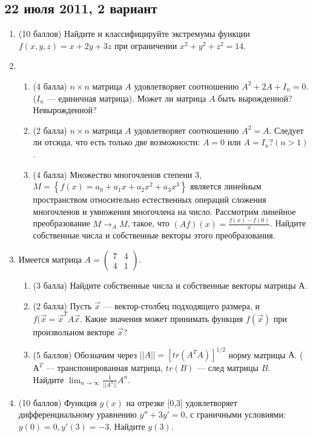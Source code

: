 \documentclass[pdftex,12pt,a4paper]{article}
\begin{document}
\subsection{22 июля 2011, 2 вариант}
\begin{enumerate}
\item (10 баллов) Найдите и классифицируйте экстремумы функции $f(x,y,z)=x+2y+3z$ при ограничении $x^2+y^2+z^2=14$.\\
\item \begin{enumerate}
\item (4 балла) $n\times n$ матрица $A$ удовлетворяет соотношению $A^2+2A+I_n=0$. ($I_n$ --- единичная матрица). Может ли матрица $A$ быть вырожденной? Невырожденной?
\item (2 балла) $n\times n$ матрица $A$ удовлетворяет соотношению $A^2=A$. Следует ли отсюда, что  есть только две возможности: $A=0$ или $A=I_n? (n>1)$.
\item (4 балла) Множество многочленов степени 3, $M=\left\{f(x)=a_0+a_1x+a_2x^2+a_3x^3\right\}$ является линейным пространством относительно естественных операций сложения многочленов и умножения многочлена на число. Рассмотрим линейное преобразование $M\longrightarrow_A M$, такое, что $(Af)(x)=\frac{f(x)-f(0)}{x}$. Найдите собственные числа и собственные векторы этого преобразования.
\end{enumerate}
\item Имеется матрица $A=\left(\begin{array}{cc}
7 & 4\\
4 & 1
\end{array}\right)$.
\begin{enumerate}
\item (3 балла) Найдите собственные числа и собственные векторы матрицы А.
\item (2 балла) Пусть $\vec{x}$ --- вектор-столбец подходящего размера, и $f(\vec{x}=\vec{x}^T A \vec{x}$. Какие значения может принимать функция $f(\vec{x})$ при произвольном векторе $\vec{x}$?
\item  (5 баллов) Обозначим через $||A||=[tr(A^TA)]^{1/2}$ норму матрицы $А$. ($А^T$ --- транспонированная матрица, $tr(B)$ --- след матрицы $B$.\\
Найдите $\lim_{n\to \infty}\frac{1}{||A^n||} A^n$.
\end{enumerate}
\item (10 баллов) Функция $y(x)$ на отрезке [0,3] удовлетворяет дифференциальному уравнению $y''+3y'=0$, с граничными условиями: $y(0)=0, y'(3)=-3$. Найдите $y(3)$.\\

\end{enumerate}
\end{document}
